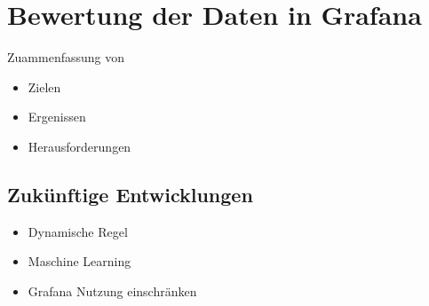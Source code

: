 \section{Bewertung der Daten in Grafana}

Zuammenfassung von

\begin{itemize}[noitemsep]
    \item Zielen
    \item Ergenissen
    \item Herausforderungen
 \end{itemize}
 
\subsection{Zukünftige Entwicklungen}

\begin{itemize}[noitemsep]
    \item Dynamische Regel
    \item Maschine Learning
    \item Grafana Nutzung einschränken
 \end{itemize}
 
